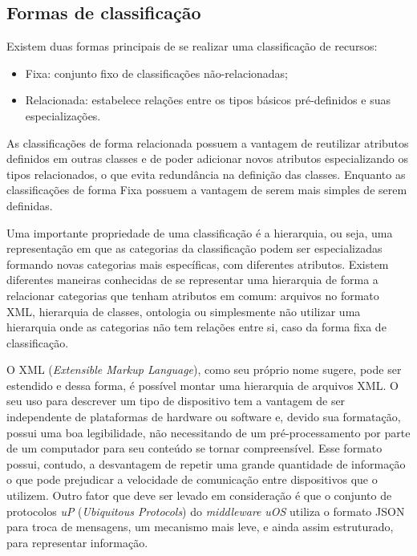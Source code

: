\subsection{Formas de classificação}

Existem duas formas principais de se realizar uma classificação de recursos:

\begin{itemize}
	\item Fixa: conjunto fixo de classificações não-relacionadas;
	\item Relacionada: estabelece relações entre os tipos básicos pré-definidos e suas especializações.
\end{itemize}

As classificações de forma relacionada possuem a vantagem de reutilizar atributos definidos em outras classes e de poder adicionar novos atributos especializando os tipos relacionados, o que evita redundância na definição das classes. Enquanto as classificações de forma Fixa possuem a vantagem de serem mais simples de serem definidas.

Uma importante propriedade de uma classificação é a hierarquia, ou seja, uma representação em que as categorias da classificação podem ser especializadas formando novas categorias mais específicas, com diferentes atributos. Existem diferentes maneiras conhecidas de se representar uma hierarquia de forma a relacionar categorias que tenham atributos em comum: arquivos no formato XML, hierarquia de classes, ontologia ou simplesmente não utilizar uma hierarquia onde as categorias não tem relações entre si, caso da forma fixa de classificação.

O XML (\emph{Extensible Markup Language}), como seu próprio nome sugere, pode ser estendido e dessa forma, é possível montar uma hierarquia de arquivos XML. O seu uso para descrever um tipo de dispositivo tem a vantagem de ser independente de plataformas de hardware ou software e, devido sua formatação, possui uma boa legibilidade, não necessitando de um pré-processamento por parte de um computador para seu conteúdo se tornar compreensível. Esse formato possui, contudo, a desvantagem de repetir uma grande quantidade de informação o que pode prejudicar a velocidade de comunicação entre dispositivos que o utilizem. Outro fator que deve ser levado em consideração é que o conjunto de protocolos \emph{uP} (\emph{Ubiquitous Protocols}) do \emph{middleware} \emph{uOS} utiliza o formato JSON para troca de mensagens, um mecanismo mais leve, e ainda assim estruturado, para representar informação.

